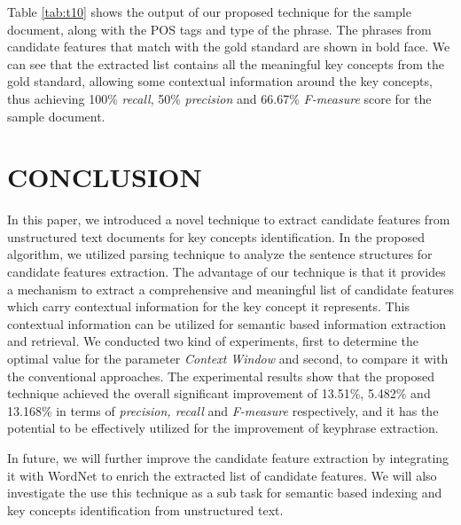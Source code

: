 \documentclass{ieeeaccess}
\begin{document}
Table \ref{tab:t10} shows the output of our proposed technique for the sample document, along with the POS tags and type of the phrase. The phrases from candidate features that match with the gold standard are shown in bold face. We can see that the extracted list contains all the meaningful key concepts from the gold standard, allowing some contextual information around the key concepts, thus achieving 100\% \textit{recall}, 50\% \textit{precision} and 66.67\% \textit{F-measure} score for the sample document.


\section{CONCLUSION}
In this paper, we introduced a novel technique to extract candidate features from unstructured text documents for key concepts identification. In the proposed algorithm, we utilized parsing technique to analyze the sentence structures for  candidate features extraction. The advantage of our technique is that it provides a mechanism to extract a comprehensive and meaningful list of candidate features which carry contextual information for the key concept it represents. This contextual information can be utilized for semantic based information extraction and retrieval. We conducted two kind of  experiments, first to determine the optimal value for the parameter \textit{Context Window} and second, to compare it with the conventional approaches. The experimental results show that the proposed technique achieved the overall significant improvement of 13.51\%, 5.482\% and 13.168\% in terms of \textit{precision, recall} and \textit{F-measure} respectively, and it has the potential to be effectively utilized for the improvement of keyphrase extraction.

In future, we will further improve the candidate feature extraction by integrating it with WordNet to enrich the extracted list of candidate features. We will also investigate the use this technique as a sub task for semantic based indexing and key concepts identification from unstructured text.
\end{document}
